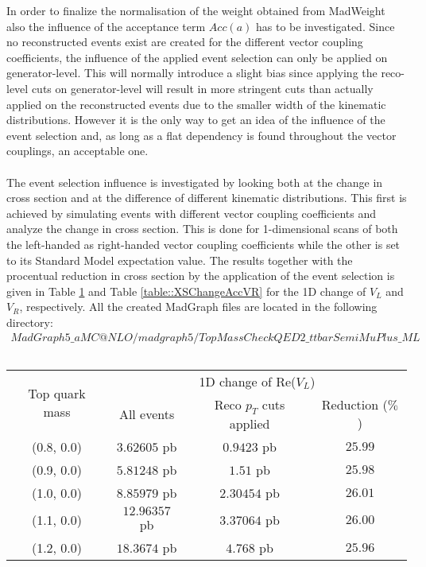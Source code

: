 In order to finalize the normalisation of the weight obtained from MadWeight also the influence of the acceptance term $Acc(a)$ has to be investigated. Since no reconstructed events exist are created for the different vector coupling coefficients, the influence of the applied event selection can only be applied on generator-level. This will normally introduce a slight bias since applying the reco-level cuts on generator-level will result in more stringent cuts than actually applied on the reconstructed events due to the smaller width of the kinematic distributions. However it is the only way to get an idea of the influence of the event selection and, as long as a flat dependency is found throughout the vector couplings, an acceptable one.\\
\\
The event selection influence is investigated by looking both at the change in cross section and at the difference of different kinematic distributions. This first is achieved by simulating events with different vector coupling coefficients and analyze the change in cross section. This is done for 1-dimensional scans of both the left-handed as right-handed vector coupling coefficients while the other is set to its Standard Model expectation value. The results together with the procentual reduction in cross section by the application of the event selection is given in Table \ref{table::XSChangeAccVL} and Table \ref{table::XSChangeAccVR} for the 1D change of $V_L$ and $V_R$, respectively. All the created MadGraph files are located in the following directory:
\begin{eqnarray*}
  MadGraph5\_aMC@NLO/madgraph5/TopMassCheckQED2\_ttbarSemiMuPlus\_ML
\end{eqnarray*}

\begin{table}[h!]
 \centering
 \begin{tabular}{|c|c|c|c|}
  \hline
  \multirow{2}{*}{Top quark mass} 	&  \multicolumn{3}{|c|}{1D change of Re($V_L$)}				\\
					&  All events	& Reco $p_T$ cuts applied	& Reduction ($\%$) 	\\
  \hline
    (0.8, 0.0) 				& $3.62605$ pb	& $0.9423$ pb			& $25.99$ 		\\
    (0.9, 0.0)				& $5.81248$ pb	& $1.51$ pb			& $25.98$		\\
    (1.0, 0.0)				& $8.85979$ pb	& $2.30454$ pb			& $26.01$ 		\\
    (1.1, 0.0)				& $12.96357$ pb	& $3.37064$ pb			& $26.00$ 		\\
    (1.2, 0.0)				& $18.3674$ pb	& $4.768$ pb			& $25.96$ 		\\
  \hline 
 \end{tabular} 
 \caption{} \label{table::XSChangeAccVL}
\end{table}

